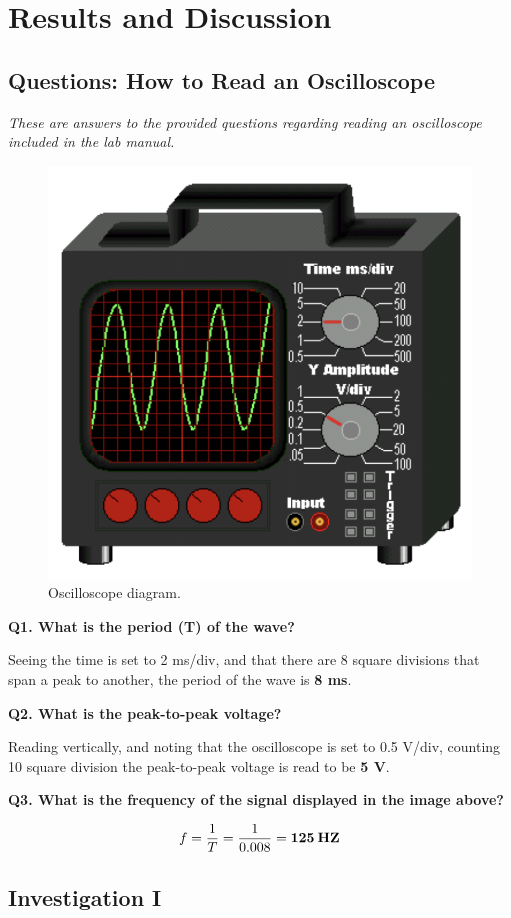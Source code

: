 \documentclass[12pt]{article}
\begin{document}
\section{Results and Discussion} \label{sec:3}

\subsection{Questions: How to Read an Oscilloscope}

\textit{These are answers to the provided questions regarding reading an oscilloscope included in the lab manual.}

\begin{figure}[H]
    \centering
    \includegraphics[width=.4\textwidth]{oscil 4 qs.png}
    \caption{Oscilloscope diagram.}
    \label{fig:5}
\end{figure}

\textbf{Q1. What is the period (T) of the wave?}

Seeing the time is set to 2 ms/div, and that there are 8 square divisions that span a peak to another, the period of the wave is \textbf{8 ms}.

\textbf{Q2. What is the peak-to-peak voltage?}

Reading vertically, and noting that the oscilloscope is set to 0.5 V/div, counting 10 square division the peak-to-peak voltage is read to be \textbf{5 V}.

\textbf{Q3. What is the frequency of the signal displayed in the image above?}

\vspace{-2ex}
\begin{gather*}
    f = \frac{1}{T} = \frac{1}{0.008} = \mathbf{125} \: \text{\textbf{HZ}}
\end{gather*}

\subsection{Investigation I}
\end{document}
